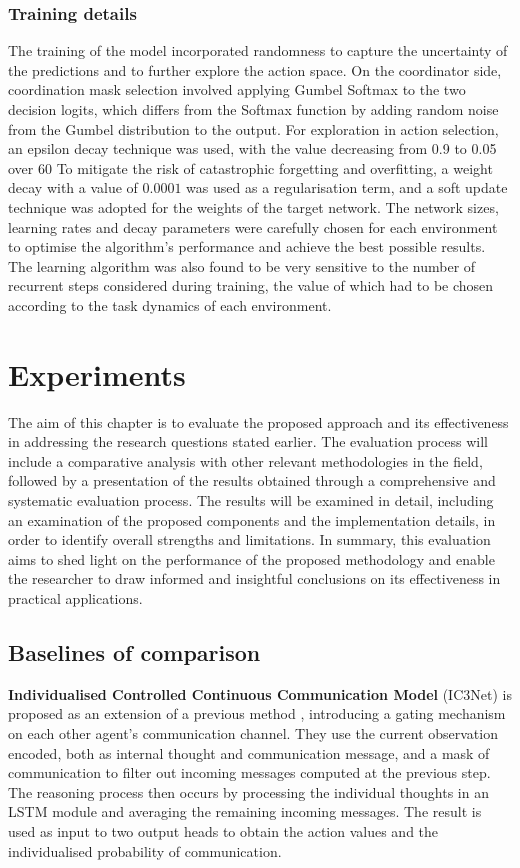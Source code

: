 \documentclass[a4paper,singleside,12pt]{report} %
\begin{document}
\subsection{Training details}\label{training-details}
The training of the model incorporated randomness to capture the uncertainty of the predictions and to further explore the action space. On the coordinator side, coordination mask selection involved applying Gumbel Softmax to the two decision logits, which differs from the Softmax function by adding random noise from the Gumbel distribution to the output. For exploration in action selection, an epsilon decay technique was used, with the value decreasing from 0.9 to 0.05 over 60%
To mitigate the risk of catastrophic forgetting and overfitting, a weight decay with a value of $0.0001$ was used as a regularisation term, and a soft update technique was adopted for the weights of the target network. The network sizes, learning rates and decay parameters were carefully chosen for each environment to optimise the algorithm's performance and achieve the best possible results. The learning algorithm was also found to be very sensitive to the number of recurrent steps considered during training, the value of which had to be chosen according to the task dynamics of each environment.

\chapter{Experiments}\label{Evaluation}
The aim of this chapter is to evaluate the proposed approach and its effectiveness in addressing the research questions stated earlier. The evaluation process will include a comparative analysis with other relevant methodologies in the field, followed by a presentation of the results obtained through a comprehensive and systematic evaluation process. The results will be examined in detail, including an examination of the proposed components and the implementation details, in order to identify overall strengths and limitations. In summary, this evaluation aims to shed light on the performance of the proposed methodology and enable the researcher to draw informed and insightful conclusions on its effectiveness in practical applications.

\section{Baselines of comparison}\label{Baselines}
\textbf{Individualised Controlled Continuous Communication Model} (IC3Net)\cite{Singh2018LearningWTIC3NET} is proposed as an extension of a previous method \cite{Sukhbaatar2016LearningMC}, introducing a gating mechanism on each other agent's communication channel. They use the current observation encoded, both as internal thought and communication message, and a mask of communication to filter out incoming messages computed at the previous step. The reasoning process then occurs by processing the individual thoughts in an LSTM module and averaging the remaining incoming messages. The result is used as input to two output heads to obtain the action values and the individualised probability of communication.
\end{document}
